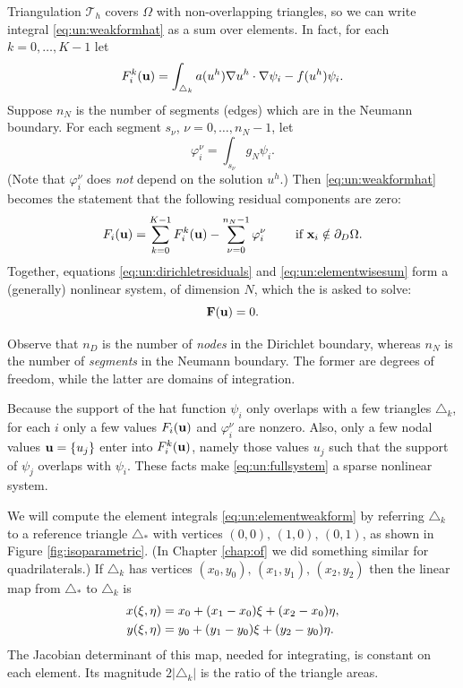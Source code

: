 Triangulation $\mathcal{T}_h$ covers $\Omega$ with non-overlapping triangles, so we can write integral \eqref{eq:un:weakformhat} as a sum over elements.  In fact, for each $k=0,\dots,K-1$ let
\begin{equation}
F_i^k(\mathbf{u}) = \int_{\triangle_k} a(u^h) \nabla u^h \cdot \nabla \psi_i - f(u^h) \psi_i.  \label{eq:un:elementweakform}
\end{equation}
Suppose $n_N$ is the number of segments (edges) which are in the Neumann boundary.  For each segment $s_\nu$, $\nu=0,\dots,n_N-1$, let
\begin{equation}
\varphi_i^\nu = \int_{s_\nu} g_N \psi_i.  \label{eq:un:segmentweakform}
\end{equation}
(Note that $\varphi_i^\nu$ does \emph{not} depend on the solution $u^h$.)  Then \eqref{eq:un:weakformhat} becomes the statement that the following residual components are zero:
\begin{equation}
F_i(\mathbf{u}) = \sum_{k=0}^{K-1} F_i^k(\mathbf{u}) - \sum_{\nu=0}^{n_N-1} \varphi_i^\nu  \qquad \text{ if } \mathbf{x}_i \notin \partial_D\Omega. \label{eq:un:elementwisesum}
\end{equation}
Together, equations \eqref{eq:un:dirichletresiduals} and \eqref{eq:un:elementwisesum} form a (generally) nonlinear system, of dimension $N$, which the \pSNES is asked to solve:
\begin{equation}
\mathbf{F}(\mathbf{u})=0. \label{eq:un:fullsystem}
\end{equation}

Observe that $n_D$ is the number of \emph{nodes} in the Dirichlet boundary, whereas $n_N$ is the number of \emph{segments} in the Neumann boundary.  The former are degrees of freedom, while the latter are domains of integration.

Because the support of the hat function $\psi_i$ only overlaps with a few triangles $\triangle_k$, for each $i$ only a few values $F_i(\mathbf{u})$ and $\varphi_i^\nu$ are nonzero.  Also, only a few nodal values $\mathbf{u}=\{u_j\}$ enter into $F_i^k(\mathbf{u})$, namely those values $u_j$ such that the support of $\psi_j$ overlaps with $\psi_i$.  These facts make \eqref{eq:un:fullsystem} a sparse nonlinear system.

We will compute the element integrals \eqref{eq:un:elementweakform} by referring $\triangle_k$ to a reference triangle $\triangle_\ast$ with vertices $(0,0),\,(1,0),\,(0,1)$, as shown in Figure \ref{fig:isoparametric}.  (In Chapter \ref{chap:of} we did something similar for quadrilaterals.)  If $\triangle_k$ has vertices $(x_0,y_0),\,(x_1,y_1),\,(x_2,y_2)$ then the linear map from $\triangle_\ast$ to $\triangle_k$ is
\begin{align}
x(\xi,\eta) &= x_0 + (x_1-x_0) \xi + (x_2-x_0) \eta, \label{eq:un:trianglemap} \\
y(\xi,\eta) &= y_0 + (y_1-y_0) \xi + (y_2-y_0) \eta. \notag
\end{align}
The Jacobian determinant of this map, needed for integrating, is constant on each element.  Its magnitude $2|\triangle_k|$ is the ratio of the triangle areas.

